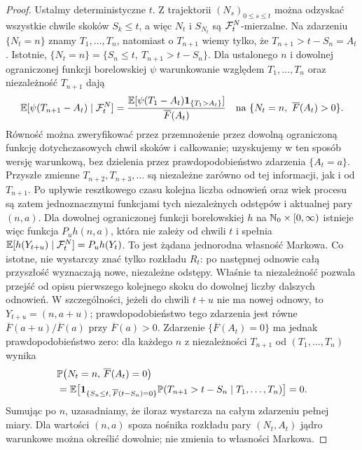\begin{proof}
Ustalmy deterministyczne $t$. Z trajektorii $(N_s)_{0\le s\le t}$
można odzyskać wszystkie chwile skoków $S_k\le t$, a więc
$N_t$ i $S_{N_t}$ są $\mathcal{F}_t^N$-mierzalne. Na zdarzeniu
$\{N_t=n\}$ znamy $T_1,\ldots,T_n$, natomiast o $T_{n+1}$
wiemy tylko, że $T_{n+1}>t-S_n=A_t$. Istotnie,
$\{N_t=n\}=\{S_n\le t,\ T_{n+1}>t-S_n\}$.
Dla ustalonego $n$ i dowolnej ograniczonej funkcji borelowskiej
$\psi$ warunkowanie względem $T_1,\ldots,T_n$ oraz
niezależność $T_{n+1}$ dają
\[
\mathbb{E}[\psi(T_{n+1}-A_t)\mid\mathcal{F}_t^N]
=\frac{\mathbb{E}[\psi(T_1-A_t)\mathbf{1}_{\{T_1>A_t\}}]}{\overline F(A_t)}
\quad\text{na }\{N_t=n,\ \overline F(A_t)>0\}.
\]
Równość można zweryfikować przez przemnożenie przez dowolną
ograniczoną funkcję dotychczasowych chwil skoków i całkowanie;
uzyskujemy w ten sposób wersję warunkową, bez dzielenia przez
prawdopodobieństwo zdarzenia $\{A_t=a\}$.
Przyszłe zmienne $T_{n+2},T_{n+3},\ldots$ są niezależne zarówno
od tej informacji, jak i od $T_{n+1}$. Po upływie resztkowego
czasu kolejna liczba odnowień oraz wiek procesu są zatem
jednoznacznymi funkcjami tych niezależnych odstępów i
aktualnej pary $(n,a)$. Dla dowolnej ograniczonej funkcji
borelowskiej $h$ na $\mathbb{N}_0\times[0,\infty)$ istnieje więc
funkcja $P_uh(n,a)$, która nie zależy od chwili $t$ i spełnia
$\mathbb{E}[h(Y_{t+u})\mid\mathcal{F}_t^N]=P_uh(Y_t)$.
To jest żądana jednorodna własność Markowa.
Co istotne, nie wystarczy znać tylko rozkładu $R_t$:
po następnej odnowie całą przyszłość wyznaczają nowe,
niezależne odstępy. Właśnie ta niezależność pozwala
przejść od opisu pierwszego kolejnego skoku do dowolnej
liczby dalszych odnowień.
W szczególności, jeżeli do chwili $t+u$ nie ma nowej odnowy,
to $Y_{t+u}=(n,a+u)$; prawdopodobieństwo tego zdarzenia
jest równe $\overline F(a+u)/\overline F(a)$ przy
$\overline F(a)>0$. Zdarzenie $\{\overline F(A_t)=0\}$
ma jednak prawdopodobieństwo zero: dla każdego $n$ z niezależności
$T_{n+1}$ od $(T_1,\ldots,T_n)$ wynika
\[
\begin{aligned}
&\mathbb{P}\bigl(N_t=n,\,\overline F(A_t)=0\bigr)\\
&=\mathbb{E}\bigl[\mathbf{1}_{\{S_n\le t,\,\overline F(t-S_n)=0\}}
     \mathbb{P}(T_{n+1}>t-S_n\mid T_1,\ldots,T_n)\bigr]=0.
\end{aligned}
\]
Sumując po $n$, uzasadniamy, że iloraz wystarcza na całym
zdarzeniu pełnej miary. Dla wartości $(n,a)$ spoza nośnika
rozkładu pary $(N_t,A_t)$ jądro warunkowe można określić
dowolnie; nie zmienia to własności Markowa.
\end{proof}

